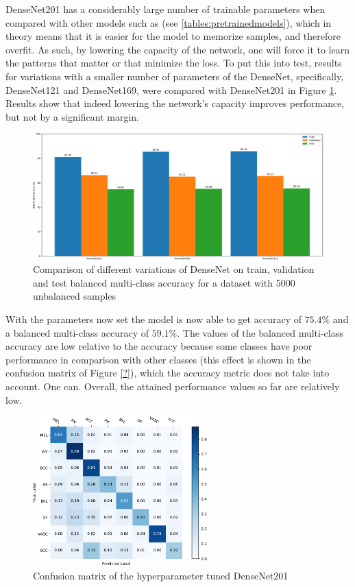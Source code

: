     DenseNet201 has a considerably large number of trainable parameters when compared with other models such as  (see \ref{tables:pretrainedmodels}), which in theory means that it is easier for the model to memorize samples, and therefore overfit. As such, by lowering the capacity of the network, one will force it to learn the patterns that matter or that minimize the loss. To put this into test, results for variations with a smaller number of parameters of the DenseNet, specifically, DenseNet121 and DenseNet169, were compared with DenseNet201 in Figure \ref{fig:densenet_variations_5000_comp}. Results show that indeed lowering the network's capacity improves performance, but not by a significant margin.
    \begin{figure}[ht]
        \centering
        \includegraphics[width=\textwidth]{figs/densenet_variations_5000_comp.pdf}
        \caption{Comparison of different variations of DenseNet on train, validation and test balanced multi-class accuracy for a dataset with 5000 unbalanced samples}
        \label{fig:densenet_variations_5000_comp}
    \end{figure}
    
    With the parameters now set the model is now able to get accuracy of $75.4\%$ and a balanced multi-class accuracy of $59.1\%$. The values of the balanced multi-class accuracy are low relative to the accuracy because some classes have poor performance in comparison with other classes (this effect is shown in the confusion matrix of Figure \ref{?}), which the accuracy metric does not take into account. One can. Overall, the attained performance values so far are relatively low. \par
    \begin{figure}[ht]
        \centering
        \includegraphics[width=0.6\textwidth]{figs/densenet201_5000_tuned_conf_matrix.pdf}
        \caption{Confusion matrix of the hyperparameter tuned DenseNet201}
        \label{fig:hyperparameter_tuned_conf_matrix}
    \end{figure}
    
